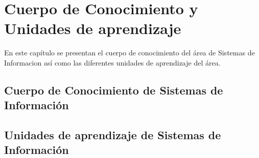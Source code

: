 \chapter{Cuerpo de Conocimiento y Unidades de aprendizaje}\label{chap:BOK}
En este capítulo se presentan el cuerpo de conocimiento del área de Sistemas de Informacion así
como las diferentes unidades de aprendizaje del área.

\section{Cuerpo de Conocimiento de Sistemas de Información}



\section{Unidades de aprendizaje de Sistemas de Información}\label{sec:LU}



